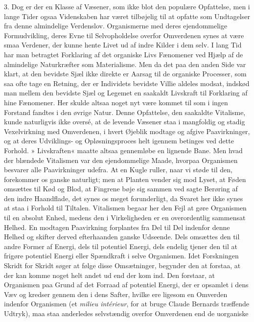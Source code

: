 \documentclass[12pt,a4paper,openany]{book}
\newcommand{\opage}[1]{\marginnote{\footnotesize\textit{[#1]}}}
\begin{document}
3. Dog er der en Klasse af Væsener, som ikke blot den populære
Opfattelse, men i lange Tider ogsaa Videnskaben har været tilbøjelig til
at opfatte som Undtagelser fra denne almindelige Verdenslov.
Organismerne med deres ejendommelige Formudvikling, deres Evne til
Selvopholdelse overfor Omverdenen synes at være smaa Verdener, der kunne
hente Livet ud af indre Kilder i dem selv. I lang Tid har man betragtet
Forklaring af det organiske Livs Fænomener ved Hjælp af de almindelige
Naturkræfter som Materialisme. Men da det paa den anden Side var klart,
at den bevidste Sjæl ikke direkte er Aarsag til de organiske Processer,
som saa ofte tage en Retning, der er Individets bevidste Villie aldeles
modsat, indskød man mellem den bevidste Sjæl og Legemet en saakaldt
Livskraft til Forklaring af hine Fænomener. Her skulde altsaa noget nyt
være kommet til som i ingen Forstand fandtes i den øvrige Natur. Denne
Opfattelse, den saakaldte Vitalisme, kunde naturligvis ikke oversé, at
de levende Væsener staa i mangfoldig og stadig Vexelvirkning med
Omverdenen, i hvert Øjeblik modtage og afgive Paavirkninger, og at deres
Udviklings- og Opløsningsproces helt igennem betinges ved dette Forhold.
»
\opage{41}Livskraften« maatte altsaa gennemløbe en lignende Bane. Men
hvad der blændede Vitalismen var den ejendommelige Maade, hvorpaa
Organismen besvarer alle Paavirkninger udefra. At en Kugle ruller, naar
vi støde til den, forekommer os ganske naturligt; men at Planten vender
sig mod Lyset, at Føden omsættes til Kød og Blod, at Fingrene bøje sig
sammen ved sagte Berøring af den indre Haandflade, det synes os meget
forunderligt, da Svaret her ikke synes at staa i Forhold til Tiltalen.
Vitalismen begaar her den Fejl at gøre Organismen til en absolut Enhed,
medens den i Virkeligheden er en overordentlig sammensat Helhed. En
modtagen Paavirkning forplantes fra Del til Del indenfor denne Helhed og
skifter derved efterhaanden ganske Udseende. Dels omsættes den til andre
Former af Energi, dels til potentiel Energi, dels endelig tjener den til
at frigøre potentiel Energi eller Spændkraft i selve Organismen. Idet
Forskningen Skridt for Skridt søger at følge disse Omsætninger, begynder
den at forstaa, at der kan komme noget helt andet ud end der kom ind.
Den forstaar, at Organismen paa Grund af det Forraad af potentiel
Energi, der er opsamlet i dens Væv og kredser gennem den i dens Safter,
hvilke ere ligesom en Omverden indenfor Organismen (et \emph{milieu
intérieur}, for at bruge Claude Bernards træffende Udtryk), maa staa
anderledes selvstændig overfor Omverdenen end de uorganiske
\end{document}
